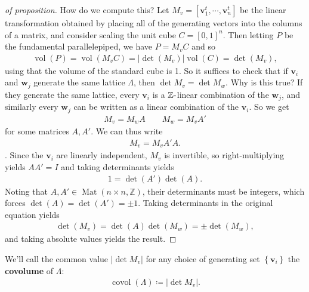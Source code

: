 \begin{proof}[of proposition]

How do we compute this? Let
\(M_v = {\left[ { \mathbf{v}_1^t, \cdots, \mathbf{v}_n^t} \right]}\) be
the linear transformation obtained by placing all of the generating
vectors into the columns of a matrix, and consider scaling the unit cube
\(C = [0, 1]^n\). Then letting \(P\) be the fundamental parallelepiped,
we have \(P = M_v C\) and so
\begin{align*}
\operatorname{vol}(P) = \operatorname{vol}(M_v C) = {\left\lvert { \det(M_v) } \right\rvert} \operatorname{vol}(C) = \det(M_v)
,\end{align*}
using that the volume of the standard cube is 1. So it suffices to check
that if \(\mathbf{v}_i\) and \(\mathbf{w}_j\) generate the same lattice
\(\Lambda\), then \(\det M_v = \det M_w\). Why is this true? If they
generate the same lattice, every \(\mathbf{v}_i\) is a
\({\mathbb{Z}}{\hbox{-}}\)linear combination of the \(\mathbf{w}_j\),
and similarly every \(\mathbf{w}_j\) can be written as a linear
combination of the \(\mathbf{v}_i\). So we get
\begin{align*}
M_v = M_w A
\qquad 
M_w = M_v A'
\end{align*}
for some matrices \(A, A'\). We can thus write
\begin{align*}
M_v = M_vA' A
.\end{align*}
. Since the \(\mathbf{v}_i\) are linearly independent, \(M_v\) is
invertible, so right-multiplying yields \(AA' = I\) and taking
determinants yields
\begin{align*}
1 = \det(A')\det(A)
.\end{align*}
Noting that \(A, A' \in \operatorname{Mat}(n\times n, {\mathbb{Z}})\),
their determinants must be integers, which forces
\(\det(A) = \det(A') = \pm 1\). Taking determinants in the original
equation yields
\begin{align*}
\det(M_v) = \det(A) \det(M_w) = \pm \det(M_w)
,\end{align*}
and taking absolute values yields the result.

\end{proof}

\begin{definition}

We'll call the common value \({\left\lvert {\det M_v} \right\rvert}\)
for any choice of generating set \(\left\{{ \mathbf{v}_i }\right\}\) the
\textbf{covolume} of \(\Lambda\):
\begin{align*}
\operatorname{covol}( \Lambda) \coloneqq{\left\lvert { \det M_v } \right\rvert}
.\end{align*}

\end{definition}

